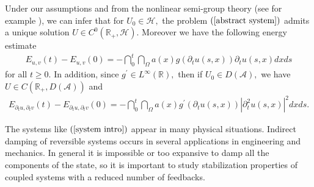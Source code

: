 \documentclass[11pt,reqno]{amsart}
\theoremstyle{plain}
\numberwithin{equation}{section}
\numberwithin{equation}{section}
\begin{document}
Under our assumptions and from the nonlinear semi-group theory (see for
example \cite{Ala nonl}), we can infer that for $U_{0}\in \mathcal{H},$ the
problem $\left( \ref{abstract system}\right) $ admits a unique solution $%
U\in C^{0}\left( 
\mathbb{R}
_{+},\mathcal{H}\right) .$ Moreover we have the following energy estimate%
\begin{equation}
\begin{array}{c}
E_{u,v}\left( t\right) -E_{u,v}\left( 0\right) =-\dint_{0}^{t}\dint_{\Omega
}a\left( x\right) g\left( \partial _{t}u\left( s,x\right) \right) \partial
_{t}u\left( s,x\right) dxds%
\end{array}
\label{energy estimate intro}
\end{equation}%
for all $t\geq 0.$ In addition, since $g^{\prime }\in L^{\infty }\left( 
\mathbb{R}
\right) ,$ then if $U_{0}\in D\left( \mathcal{A}\right) ,$ we have $U\in
C\left( 
\mathbb{R}
_{+},D\left( \mathcal{A}\right) \right) $ and%
\begin{equation}
\begin{array}{c}
E_{\partial _{t}u,\partial _{t}v}\left( t\right) -E_{\partial _{t}u,\partial
_{t}v}\left( 0\right) =-\dint_{0}^{t}\dint_{\Omega }a\left( x\right)
g^{\prime }\left( \partial _{t}u\left( s,x\right) \right) \left\vert
\partial _{t}^{2}u\left( s,x\right) \right\vert ^{2}dxds.%
\end{array}
\label{hight energy estimate intro}
\end{equation}

The systems like $\left( \ref{system intro}\right) $ appear in many physical
situations. Indirect damping of reversible systems occurs in several
applications in engineering and mechanics. In general it is impossible or
too expansive to damp all the components of the state, so it is important to
study stabilization properties of coupled systems with a reduced number of
feedbacks.\newline
\end{document}
